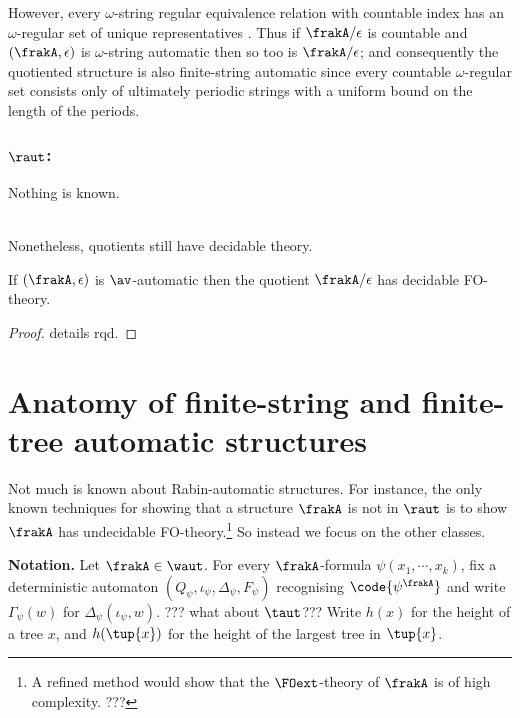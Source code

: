 However, every $\omega$-string regular equivalence relation with countable index has an $\omega$-regular set of unique representatives \cite{KRB08}.
Thus if $\frakA /\epsilon$ is countable and $(\frakA,\epsilon)$ is $\omega$-string automatic then so too is $\frakA/\epsilon$; and consequently the quotiented structure
is also finite-string automatic since every countable $\omega$-regular set consists only of ultimately periodic strings with a uniform bound on the length of the periods.

\subsubsection*{$\raut$:}
Nothing is known.

~\\

Nonetheless, quotients still have decidable theory.

\begin{proposition}
If $(\frakA,\epsilon)$ is $\av$-automatic then the quotient $\frakA/\epsilon$ has decidable FO-theory.
\end{proposition}

\begin{proof} 
details rqd.
\end{proof}

\section{Anatomy of finite-string and finite-tree automatic structures}



Not much is known about Rabin-automatic structures. For instance, the only known techniques for showing that a structure
$\frakA$ is not in $\raut$ is to show $\frakA$ has undecidable FO-theory.\footnote{A refined method would show that the $\FOext$-theory
of $\frakA$ is of high complexity. ??? } So instead we focus on the other classes.

{\bf Notation.} Let $\frakA \in \waut$. For every ${\frakA}$-formula $\psi(x_1,\cdots,x_k)$, fix a
deterministic automaton %
$(Q_\psi,\iota_\psi,\Delta_\psi,F_\psi)$ recognising $\code{\psi^{\frakA}}$ and write
$\Gamma_\psi(w)$ for $\Delta_\psi(\iota_\psi,w)$.
??? what about $\taut$???
Write $h(x)$ for the height of a tree $x$, and $h(\tup{x})$ for the height of the largest tree in $\tup{x}$.

